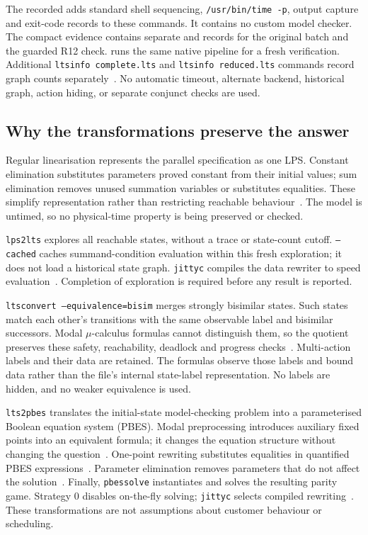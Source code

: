 \documentclass[11pt,a4paper]{article}
\begin{document}
The recorded  adds standard shell sequencing, \texttt{/usr/bin/time -p}, output capture and exit-code records to these commands. It contains no custom model checker. The compact evidence contains separate  and  records for the original batch and the guarded R12 check.  runs the same native pipeline for a fresh verification. Additional \texttt{ltsinfo complete.lts} and \texttt{ltsinfo reduced.lts} commands record graph counts separately~\cite{ltsinfo}. No automatic timeout, alternate backend, historical graph, action hiding, or separate conjunct checks are used.

\subsection{Why the transformations preserve the answer}
Regular linearisation represents the parallel specification as one LPS. Constant elimination substitutes parameters proved constant from their initial values; sum elimination removes unused summation variables or substitutes equalities. These simplify representation rather than restricting reachable behaviour~\cite{mcrl22lps,lpsconstelm,lpssumelm}. The model is untimed, so no physical-time property is being preserved or checked.

\texttt{lps2lts} explores all reachable states, without a trace or state-count cutoff. \texttt{--cached} caches summand-condition evaluation within this fresh exploration; it does not load a historical state graph. \texttt{jittyc} compiles the data rewriter to speed evaluation~\cite{lps2lts}. Completion of exploration is required before any result is reported.

\texttt{ltsconvert --equivalence=bisim} merges strongly bisimilar states. Such states match each other's transitions with the same observable label and bisimilar successors. Modal $\mu$-calculus formulas cannot distinguish them, so the quotient preserves these safety, reachability, deadlock and progress checks~\cite[Chs.~2 and 6]{book}\cite{ltsconvert}. Multi-action labels and their data are retained. The formulas observe those labels and bound data rather than the file's internal state-label representation. No labels are hidden, and no weaker equivalence is used.

\texttt{lts2pbes} translates the initial-state model-checking problem into a parameterised Boolean equation system (PBES). Modal preprocessing introduces auxiliary fixed points into an equivalent formula; it changes the equation structure without changing the question~\cite{lts2pbes}. One-point rewriting substitutes equalities in quantified PBES expressions~\cite{pbesrewr}. Parameter elimination removes parameters that do not affect the solution~\cite{pbesparelm}. Finally, \texttt{pbessolve} instantiates and solves the resulting parity game. Strategy 0 disables on-the-fly solving; \texttt{jittyc} selects compiled rewriting~\cite{pbessolve}. These transformations are not assumptions about customer behaviour or scheduling.
\end{document}
